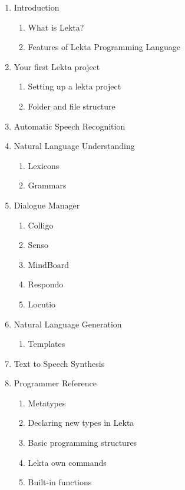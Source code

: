 \documentclass[a4paper,10pt]{article}
\begin{document}
\begin{enumerate}
	\item Introduction
	\begin{enumerate}
		\item What is Lekta?
		\item Features of Lekta Programming Language
	\end{enumerate}
	\item Your first Lekta project
		\begin{enumerate}
			\item Setting up a lekta project
			\item Folder and file structure
		\end{enumerate}
	\item Automatic Speech Recognition
	\item Natural Language Understanding
	\begin{enumerate}
		\item Lexicons
		\item Grammars
	\end{enumerate}
	\item Dialogue Manager
	\begin{enumerate}
		\item Colligo
		\item Senso
		\item MindBoard
		\item Respondo
		\item Locutio
	\end{enumerate}
	\item Natural Language Generation
	\begin{enumerate}
		\item Templates
	\end{enumerate}
	\item Text to Speech Synthesis
	\item Programmer Reference
	\begin{enumerate}
		\item Metatypes
		\item Declaring new types in Lekta
		\item Basic programming structures
		\item Lekta own commands 
		\item Built-in functions
	\end{enumerate}
\end{enumerate}
\end{document}
